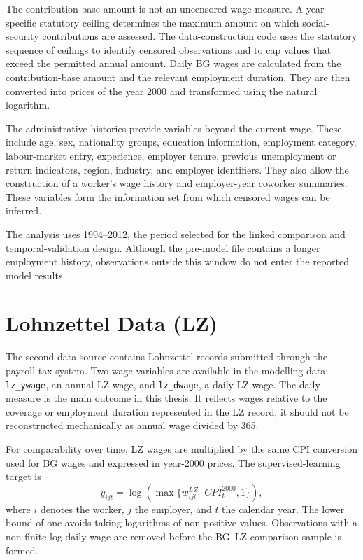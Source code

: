 \documentclass[12pt,a4paper,oneside,titlepage]{book}
\begin{document}
The contribution-base amount is not an uncensored wage measure. A year-specific statutory ceiling determines the maximum amount on which social-security contributions are assessed. The data-construction code uses the statutory sequence of ceilings to identify censored observations and to cap values that exceed the permitted annual amount. Daily BG wages are calculated from the contribution-base amount and the relevant employment duration. They are then converted into prices of the year 2000 and transformed using the natural logarithm.

The administrative histories provide variables beyond the current wage. These include age, sex, nationality groups, education information, employment category, labour-market entry, experience, employer tenure, previous unemployment or return indicators, region, industry, and employer identifiers. They also allow the construction of a worker's wage history and employer-year coworker summaries. These variables form the information set from which censored wages can be inferred.

The analysis uses 1994--2012, the period selected for the linked comparison and temporal-validation design. Although the pre-model file contains a longer employment history, observations outside this window do not enter the reported model results.

\section{Lohnzettel Data (LZ)}
The second data source contains Lohnzettel records submitted through the payroll-tax system. Two wage variables are available in the modelling data: \texttt{lz\_ywage}, an annual LZ wage, and \texttt{lz\_dwage}, a daily LZ wage. The daily measure is the main outcome in this thesis. It reflects wages relative to the coverage or employment duration represented in the LZ record; it should not be reconstructed mechanically as annual wage divided by 365.

For comparability over time, LZ wages are multiplied by the same CPI conversion used for BG wages and expressed in year-2000 prices. The supervised-learning target is
\begin{equation}
  y_{ijt}=\log\!\left(\max\{w^{LZ}_{ijt}\cdot CPI^{2000}_t,1\}\right),
  \label{eq:lz-target}
\end{equation}
where $i$ denotes the worker, $j$ the employer, and $t$ the calendar year. The lower bound of one avoids taking logarithms of non-positive values. Observations with a non-finite log daily wage are removed before the BG--LZ comparison sample is formed.
\end{document}
